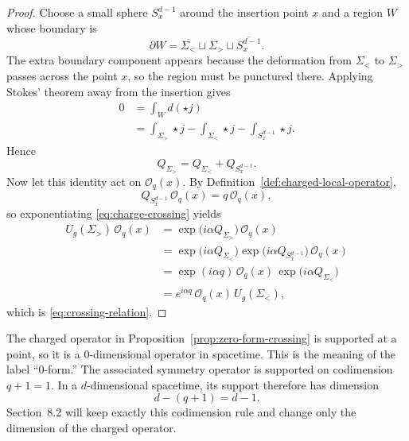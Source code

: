 \begin{proof}
Choose a small sphere $S_x^{d-1}$ around the insertion point $x$ and a region $W$ whose boundary is
\begin{equation*}
\partial W = \overline{\Sigma_{<}}\sqcup \Sigma_{>}\sqcup \overline{S_x^{d-1}}.
\end{equation*}
The extra boundary component appears because the deformation from $\Sigma_{<}$ to $\Sigma_{>}$ passes across the point $x$, so the region must be punctured there. Applying Stokes' theorem away from the insertion gives
\begin{align*}
0
&=
\int_W d(\star j) \\
&=
\int_{\Sigma_{>}}\star j
-\int_{\Sigma_{<}}\star j
-\int_{S_x^{d-1}}\star j.
\end{align*}
Hence
\begin{equation}\label{eq:charge-crossing}
Q_{\Sigma_{>}} = Q_{\Sigma_{<}} + Q_{S_x^{d-1}}.
\end{equation}
Now let this identity act on $\mathcal O_q(x)$. By Definition~\ref{def:charged-local-operator},
\begin{equation*}
Q_{S_x^{d-1}}\,\mathcal O_q(x)=q\,\mathcal O_q(x),
\end{equation*}
so exponentiating \eqref{eq:charge-crossing} yields
\begin{align*}
U_g(\Sigma_{>})\,\mathcal O_q(x)
&=
\exp\!\bigl(i\alpha Q_{\Sigma_{>}}\bigr)\,\mathcal O_q(x) \\
&=
\exp\!\bigl(i\alpha Q_{\Sigma_{<}}\bigr)\exp\!\bigl(i\alpha Q_{S_x^{d-1}}\bigr)\,\mathcal O_q(x) \\
&=
\exp(i\alpha q)\,\mathcal O_q(x)\,\exp\!\bigl(i\alpha Q_{\Sigma_{<}}\bigr) \\
&=
e^{i\alpha q}\,\mathcal O_q(x)\,U_g(\Sigma_{<}),
\end{align*}
which is \eqref{eq:crossing-relation}.
\end{proof}

\begin{remark}\label{rem:why-zero-form}
The charged operator in Proposition~\ref{prop:zero-form-crossing} is supported at a point, so it is a $0$-dimensional operator in spacetime. This is the meaning of the label ``$0$-form.'' The associated symmetry operator is supported on codimension $q+1=1$. In a $d$-dimensional spacetime, its support therefore has dimension
\begin{equation*}
d-(q+1)=d-1.
\end{equation*}
Section~8.2 will keep exactly this codimension rule and change only the dimension of the charged operator.
\end{remark}

